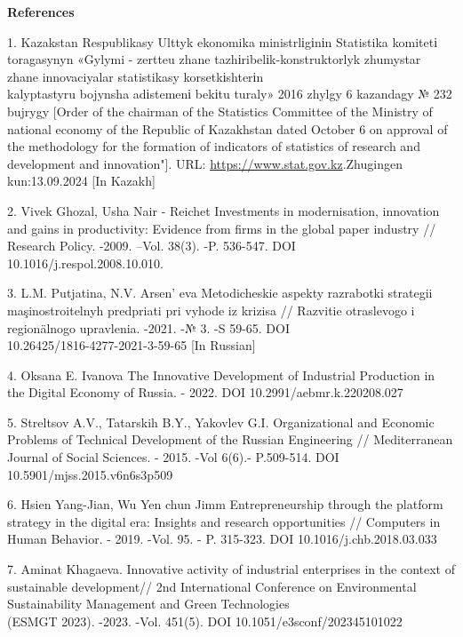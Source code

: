 \begin{center}
{\bfseries References}
\end{center}

\begin{references}
1. Kazakstan Respublikasy Ulttyk ekonomika ministrlіgіnіn Statistika
komitetі toragasynyn «Gylymi - zertteu zhane tazhіribelіk-konstruktorlyk
zhumystar zhane innovaciyalar statistikasy korsetkіshterіn \\kalyptastyru
bojynsha adіstemenі bekіtu turaly» 2016 zhylgy 6 kazandagy № 232 bujrygy
{[}Order of the chairman of the Statistics Committee of the Ministry of
national economy of the Republic of Kazakhstan dated October 6 on
approval of the methodology for the formation of indicators of
statistics of research and development and innovation"{]}. URL:
\href{https://www.stat.gov.kz/}{https://www.stat.gov.kz}.Zhugingen kun:13.09.2024 {[}In Kazakh{]}

2. Vivek Ghozal, Usha Nair - Reichet Investments in modernisation,
innovation and gains in productivity: Evidence from firms in the global
paper industry // Research Policy. -2009. --Vol. 38(3). -P. 536-547. DOI
10.1016/j.respol.2008.10.010.

3. L.M. Putjatina, N.V. Arsen' eva Metodicheskie aspekty
razrabotki strategii maşinostroitelnyh predpriati pri vyhode iz krizisa
// Razvitie otraslevogo i regionälnogo upravlenia. -2021. -№ 3. -S
59-65. DOI \\10.26425/1816-4277-2021-3-59-65 {[}In Russian{]}

4. Oksana E. Ivanova The Innovative Development of Industrial Production
in the Digital Economy of Russia. - 2022. DOI 10.2991/aebmr.k.220208.027

5. Streltsov A.V., Tatarskih B.Y., Yakovlev G.I. Organizational and
Economic Problems of Technical Development of the Russian Engineering //
Mediterranean Journal of Social Sciences. - 2015. -Vol 6(6).- P.509-514.
DOI 10.5901/mjss.2015.v6n6s3p509

6. Hsien Yang-Jian, Wu Yen chun Jimm Entrepreneurship through the
platform strategy in the digital era: Insights and research
opportunities // Computers in Human Behavior. - 2019. -Vol. 95. - P.
315-323. DOI 10.1016/j.chb.2018.03.033

7. Aminat Khagaeva. Innovative activity of industrial enterprises in the
context of sustainable development// 2nd International Conference on
Environmental Sustainability Management and Green Technologies \\(ESMGT
2023). -2023. -Vol. 451(5). DOI 10.1051/e3sconf/202345101022


\end{references}
